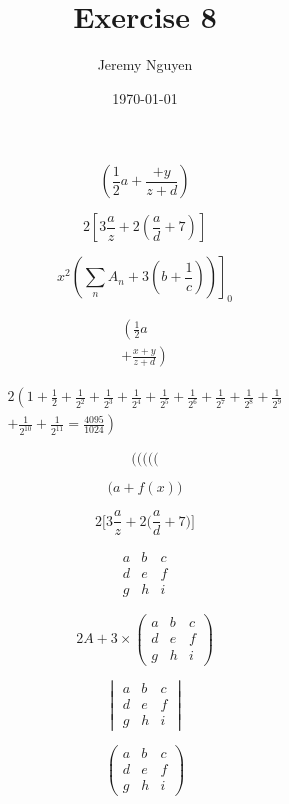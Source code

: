 \documentclass[11pt]{article}
\begin{document}
\title{Exercise 8}
\author{Jeremy Nguyen}
\date{\today}
\maketitle

\[
	\left(\frac12 a+\frac{+y}{z+d}\right)
\]

\[
	2\left[3\frac{a}{z}+2\left(\frac{a}{d}+7\right)\right]
\]

\[
	\left. x^2\left(\sum_{n}A_{n}+3\left(b+\frac{1}{c}\right)\right) \right]_{0}
\]

\begin{multline}
	\left(\frac12 a \right. \\
	\left.+\frac{x+y}{z+d}\right)
\end{multline}

\begin{multline}
	2\left(1+\frac{1}{2}+\frac{1}{2^{2}}+\frac{1}{2^{3}}+\frac{1}{2^{4}}+\frac{1}{2^{5}}+\frac{1}{2^{6}}+\frac{1}{2^{7}}+\frac{1}{2^{8}}+\frac{1}{2^{9}} \right. \\
	\left.+\frac{1}{2^{10}}+\frac{1}{2^{11}} = \frac{4095}{1024}\right)
\end{multline}

\[
	(\big( \Big( \bigg( \Bigg(
\]

\[
	\big (a+f(x)\big)
\]

\[
	2\bigg[3\frac{a}{z}+2\Big(\frac{a}{d}+7\Big)\bigg]
\]

\[
	\begin{matrix}
		a & b & c \\
		d & e & f \\
		g & h & i
	\end{matrix}
\]

\[
	2A+3\times\begin{pmatrix}
		a & b & c \\
		d & e & f \\
		g & h & i
	\end{pmatrix}
\]

\[
	\begin{vmatrix}
		a & b & c \\
		d & e & f \\
		g & h & i
	\end{vmatrix}
\]

\[
	\left(\begin{matrix}
			a & b & c \\
			d & e & f \\
			g & h & i
		\end{matrix}\right)
\]
\end{document}
